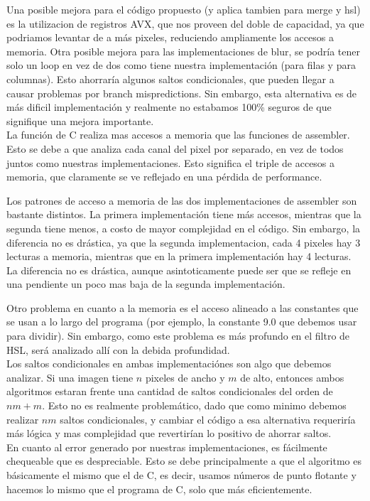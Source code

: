 Una posible mejora para el código propuesto (y aplica tambien para merge y hsl) es la utilizacion de registros AVX, que nos proveen del doble de capacidad, ya que podriamos levantar de a más pixeles, reduciendo ampliamente los accesos a memoria.
Otra posible mejora para las implementaciones de blur, se podría tener solo un loop en vez de dos como tiene nuestra implementación (para filas y para columnas). Esto ahorraría algunos saltos condicionales, que pueden llegar a causar problemas por branch mispredictions.
Sin embargo, esta alternativa es de más dificil implementación y realmente no estabamos 100\% seguros de que signifique una mejora importante.
\\

La función de C realiza mas accesos a memoria que las funciones de assembler. Esto se debe a que analiza cada canal del pixel por separado, en vez de todos juntos como nuestras implementaciones. Esto significa el triple de accesos a memoria, que claramente se ve reflejado en una pérdida de performance.

Los patrones de acceso a memoria de las dos implementaciones de assembler son bastante distintos. La primera implementación tiene más accesos, mientras que la segunda tiene menos, a costo de mayor complejidad en el código. Sin embargo, la diferencia no es drástica, ya que la segunda implementacion, cada 4 pixeles hay 3 lecturas a memoria, mientras que en la primera implementación hay 4 lecturas. La diferencia no es drástica, aunque asintoticamente puede ser que se refleje en una pendiente un poco mas baja de la segunda implementación.

Otro problema en cuanto a la memoria es el acceso alineado a las constantes que se usan a lo largo del programa (por ejemplo, la constante 9.0 que debemos usar para dividir). Sin embargo, como este problema es más profundo en el filtro de HSL, será analizado allí con la debida profundidad.
\\

Los saltos condicionales en ambas implementaciónes son algo que debemos analizar. Si una imagen tiene $n$ pixeles de ancho y $m$ de alto, entonces ambos algoritmos estaran frente una cantidad de saltos condicionales del orden de $nm+m$.
Esto no es realmente problemático, dado que como minimo debemos realizar $nm$ saltos condicionales, y cambiar el código a esa alternativa requeriría más lógica y mas complejidad que revertirían lo positivo de ahorrar saltos.
\\

En cuanto al error generado por nuestras implementaciones, es fácilmente chequeable que es despreciable. Esto se debe principalmente a que el algoritmo es básicamente el mismo que el de C, es decir, usamos números de punto flotante y hacemos lo mismo que el programa de C, solo que más eficientemente.













